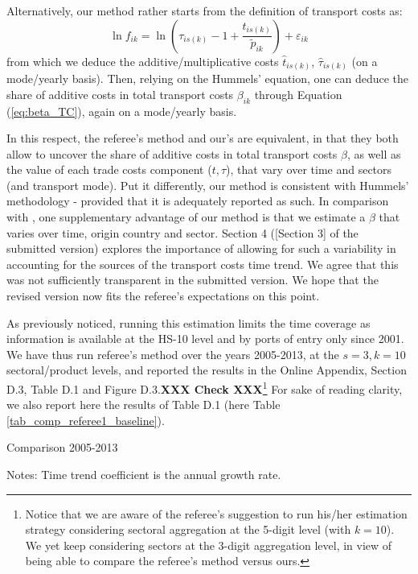 \documentclass[a4paper,11pt]{article}
\begin{document}
\begin{itemize}
 Alternatively, our method rather starts from the definition of transport costs as:
     $$\ln f_{ik} = \ln\left(\tau_{is(k)} -1 + \frac{t_{is(k)}}{\widetilde{p}_{ik}}\right) +\varepsilon_{ik}$$
\noindent from which we deduce the additive/multiplicative costs $\widehat{t}_{is(k)}$, $\widehat{\tau}_{is(k)}$ (on a mode/yearly basis). Then, relying on the Hummels' equation, one can deduce the share of additive costs in total transport costs $\beta_{ik}$ through Equation (\ref{eq:beta_TC}), again on a mode/yearly basis.


In this respect, the referee's method and our's are equivalent, in that they both allow to uncover the share of additive costs in total transport costs $\beta$, as well as the value of each trade costs component ($t,\tau$), that vary over time and sectors (and transport mode). Put it differently, our method is consistent with Hummels' methodology - provided that it is adequately reported as such. In comparison with \cite{hummels2007}, one supplementary advantage of our method is that we estimate a $\beta$ that varies over time, origin country and sector. Section 4 ([Section 3] of the submitted version) explores the importance of allowing for such a variability in accounting for the sources of the transport costs time trend. We agree that this was not sufficiently transparent in the submitted version. We hope that the revised version now fits the referee's expectations on this point.

\end{itemize}

As previously noticed, running this estimation limits the time coverage as information is available at the HS-10 level and by ports of entry only since 2001. We have thus run referee's method over the years 2005-2013, at the $s=3, k=10$ sectoral/product levels, and reported the results in the Online Appendix, Section D.3, Table D.1 and Figure D.3.\textbf{XXX Check XXX}\footnote{Notice that we are aware of the referee's suggestion to run his/her estimation strategy considering sectoral aggregation at the 5-digit level (with $k=10$). We yet keep considering sectors at the 3-digit aggregation level, in view of being able to compare the referee's method versus ours.} For sake of reading clarity, we also report here the results of Table D.1 (here Table \ref{tab_comp_referee1_baseline}).

\begin{table}[htbp]
	\caption{Comparison 2005-2013}
	\begin{center}		
		
	
{\parbox[l]{12cm}{ \vspace{4pt}\footnotesize{Notes: Time trend coefficient is the annual growth rate.}}}
\end{center}
	\label{tab_comp_referee1_baseline}%
\end{table}%
\end{document}
